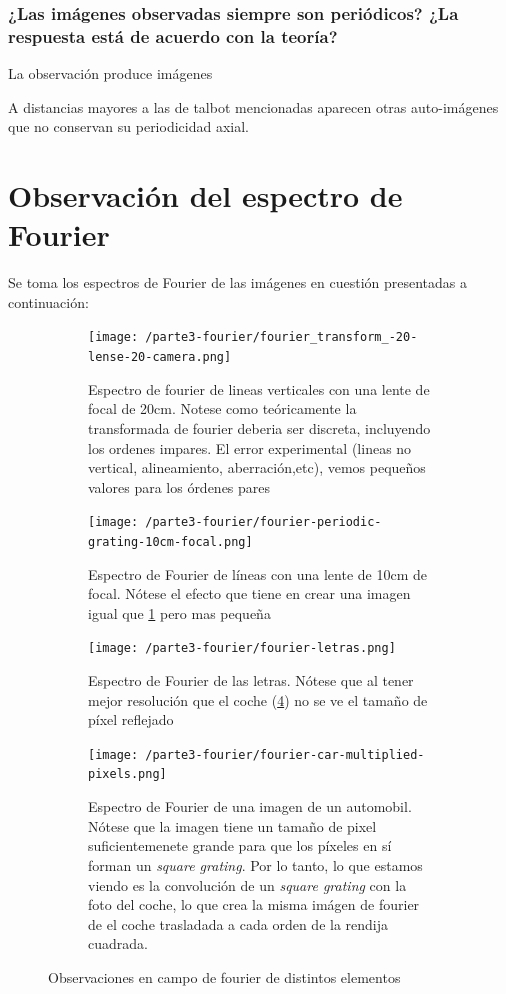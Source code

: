 \documentclass{./packages/optica-article}
\begin{document}
\subsubsection{ ¿Las imágenes observadas siempre son periódicos? ¿La respuesta está de acuerdo con la teoría?}
	
	La observación produce imágenes 

	      A distancias mayores a las de talbot mencionadas aparecen otras auto-imágenes que no conservan su periodicidad axial.

\section{Observación del espectro de Fourier}
Se toma los espectros de Fourier de las imágenes en cuestión presentadas a continuación:

\begin{figure}[hptb]
	\begin{center}
		\begin{subfigure}[t]{0.45\textwidth}\centering
			\texttt{[image: /parte3-fourier/fourier\_transform\_-20-lense-20-camera.png]}
			\caption{Espectro de fourier de lineas verticales  con una lente de focal de 20cm. Notese como teóricamente la transformada de fourier deberia ser discreta, incluyendo los ordenes impares. El error experimental (lineas no vertical, alineamiento, aberración,etc), vemos pequeños valores para los órdenes pares}
			\label{fig:fourier1}
		\end{subfigure}
		\quad
		\begin{subfigure}[t]{0.45\textwidth}\centering
			\texttt{[image: /parte3-fourier/fourier-periodic-grating-10cm-focal.png]}
			\caption{Espectro de Fourier de líneas con una lente de 10cm de focal. Nótese el efecto que tiene en crear una imagen igual que \ref{fig:fourier1} pero mas pequeña}
			\label{fourier4}
		\end{subfigure}

		\begin{subfigure}[t]{0.45\textwidth}\centering
			\texttt{[image: /parte3-fourier/fourier-letras.png]}
			\caption{Espectro de Fourier de las letras. Nótese que al tener mejor resolución que el coche (\ref{fig:fourier2}) no se ve el tamaño de píxel reflejado}
			\label{fourier3}
		\end{subfigure}
		\quad
		\begin{subfigure}[t]{0.45\textwidth}\centering
			\texttt{[image: /parte3-fourier/fourier-car-multiplied-pixels.png]}
			\caption{Espectro de Fourier de una imagen de un automobil. Nótese que la imagen tiene un tamaño de pixel suficientemenete grande para que los píxeles en sí forman un \emph{square grating}. Por lo tanto, lo que estamos viendo es la convolución de un \emph{square grating} con la foto del coche, lo que crea la misma imágen de fourier de el coche trasladada a cada orden de la rendija cuadrada.}
			\label{fig:fourier2}
		\end{subfigure}
		\caption{Observaciones en campo de fourier de distintos elementos}\label{fig:alltalbot}
	\end{center}
\end{figure}
\end{document}
